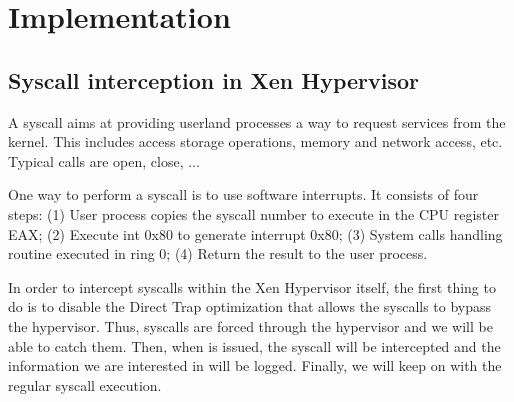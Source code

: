  \section{Implementation} \label{sec:impl}

\subsection{Syscall interception in Xen Hypervisor}\label{sec:interception}
A syscall aims at providing userland processes a way to request services 
from the kernel. This includes access storage operations, memory and network 
access, etc. Typical calls are open, close, \read... 

One way to perform a syscall is to use software interrupts. It consists of 
four steps: (1) User process copies the syscall number to execute in the CPU register 
EAX; (2) Execute int 0x80 to generate interrupt 0x80; (3) System calls handling 
routine executed in ring 0; (4) Return the result to the user process.

In order to intercept syscalls within the Xen Hypervisor itself, the first thing to do 
is to disable the Direct Trap optimization that allows the syscalls to bypass the 
hypervisor. Thus, syscalls are forced through the hypervisor and we will be able to 
catch them.  Then, when is issued, the syscall will be intercepted and the information 
we are interested in will be logged. Finally, we will keep on with the regular syscall 
execution.
